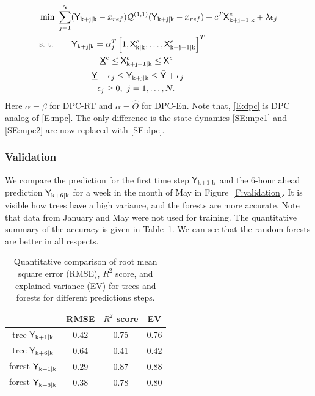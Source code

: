 \begin{subequations}
\begin{align}
\text{min } & \sum_{j=1}^{N} ({\mathsf{Y}}_{\mathrm{k+j|k}} - x_{ref}) \mathcal{Q}^{(1,1)} ({\mathsf{Y}}_{\mathrm{k+j|k}} - x_{ref}) + c^T \mathsf{X}^c_{\mathrm{k+j-1|k}}+  \lambda\epsilon_j\\
\text{s.~t. } & \ \ \ \ \ \mathsf{Y}_{\mathrm{k+j|k}} =  \alpha_j^T \left[1,\mathsf{X}^c_{\mathrm{k|k}},\dots,\mathsf{X}^c_{\mathrm{k+j-1|k}} \right]^T \label{SE:dpc}\\
& \ \ \ \ \ \ \ \ \ \ \ \ \ \ \ \underline{\mathsf{X}}^c \leq \mathsf{X}^c_{\mathrm{k+j-1|k}} \leq \bar{\mathsf{X}}^c\\ 
& \ \ \ \ \ \ \ \ \ \ \ \ \underline{\mathsf{Y}}-\epsilon_j \leq \mathsf{Y}_{\mathrm{k+j|k}} \leq \bar{\mathsf{Y}} + \epsilon_j\\\
& \ \ \ \ \ \ \ \ \ \ \ \ \ \ \epsilon_j \geq 0, \ j = 1,\dots,N.
\end{align} \label{E:dpc}
\end{subequations}
\noindent Here $\alpha = \beta$ for DPC-RT and $\alpha = \hat{\Theta}$ for DPC-En.
Note that, \eqref{E:dpc} is DPC analog of \eqref{E:mpc}. The only difference is the state dynamics \eqref{SE:mpc1} and \eqref{SE:mpc2} are now replaced with \eqref{SE:dpc}.

\subsubsection{Validation} 
\label{SSS:dpc_val}

We compare the prediction for the first time step $\mathsf{Y}_{\mathrm{k+1|k}}$ and the 6-hour ahead prediction $\mathsf{Y}_{\mathrm{k+6|k}}$ for a week in the month of May in Figure~\ref{F:validation}. It is visible how trees have a high variance, and the forests are more accurate. Note that data from January and May were not used for training. The quantitative summary of the accuracy is given in Table~\ref{T:validation}. We can see that the random forests are better in all respects.
\begin{table}[h!]
	\centering
	\begin{tabular}{cccc}
		\toprule
		& RMSE & $R^2$ score & EV  \\ 
		\midrule
		tree-$\mathsf{Y}_{\mathrm{k+1|k}}$    &  0.42 &  0.75 & 0.76    \\
		tree-$\mathsf{Y}_{\mathrm{k+6|k}}$  & 0.64 &  0.41  & 0.42 \\
		forest-$\mathsf{Y}_{\mathrm{k+1|k}}$  & 0.29 & 0.87  & 0.88 \\
		forest-$\mathsf{Y}_{\mathrm{k+6|k}}$  & 0.38 & 0.78 & 0.80 \\
		\bottomrule
	\end{tabular}
	\caption{Quantitative comparison of root mean square error (RMSE), $R^2$ score, and explained variance (EV) for trees and forests for different predictions steps.}
	\captionsetup{justification=centering}
	\label{T:validation}
\end{table}

